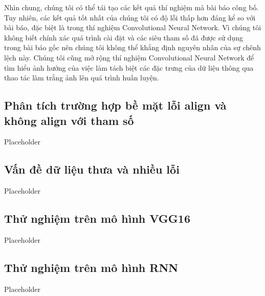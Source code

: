 Nhìn chung, chúng tôi có thể tái tạo các kết quả thí nghiệm mà bài báo công bố. Tuy nhiên, các kết quả tốt nhất của chúng tôi có độ lỗi thấp hơn đáng kể so với bài báo, đặc biệt là trong thí nghiệm Convolutional Neural Network. Vì chúng tôi không biết chính xác quá trình cài đặt và các siêu tham số đã được sử dụng trong bài báo gốc nên chúng tôi không thể khẳng định nguyên nhân của sự chênh lệch này. Chúng tôi cũng mở rộng thí nghiệm Convolutional Neural Network để tìm hiểu ảnh hưởng của việc làm tách biệt các đặc trưng của dữ liệu thông qua thao tác làm trắng ảnh lên quá trình huấn luyện.

\subsection{Phân tích trường hợp bề mặt lỗi align và không align với tham số}

Placeholder

\subsection{Vấn đề dữ liệu thưa và nhiều lỗi}

Placeholder

\subsection{Thử nghiệm trên mô hình VGG16}

Placeholder

\subsection{Thử nghiệm trên mô hình RNN}

Placeholder